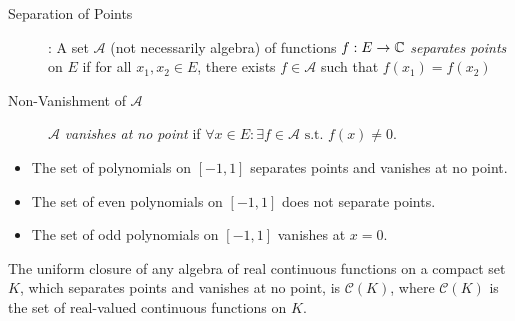 \begin{define}[30]
	\hfill
	\begin{description}
		\item[Separation of Points]: A set $\mathcal{A}$ (not necessarily algebra) of functions $f:E\to \mathbb{C}$ \textit{separates points}  on $E$ if for all $x_1,x_2 \in E$, there exists $f \in \mathcal{A}$ such that $f(x_1)=f(x_2)$
		\item[Non-Vanishment of $\mathcal{A}$] $\mathcal{A}$ \textit{vanishes at no point} if  $\forall{x \in E}: \exists{f \in \mathcal{A}} \text{ s.t. } f(x)\neq 0$.
	\end{description}
	\begin{example}
		\begin{itemize}
			\item The set of polynomials  on $[-1,1]$ separates points and vanishes at no point.
			\item The set of even polynomials on $[-1,1]$ does not separate points.
			\item The set of odd polynomials on $[-1,1]$ vanishes at $x=0$.
		\end{itemize}
	\end{example}
\end{define}

\begin{thm}
	The uniform closure of any algebra of real continuous functions on a compact set $K$, which separates points and vanishes at no point, is $\mathcal{C}(K)$, where $\mathcal{C}(K)$ is the set of real-valued continuous functions on $K$.
\end{thm}


